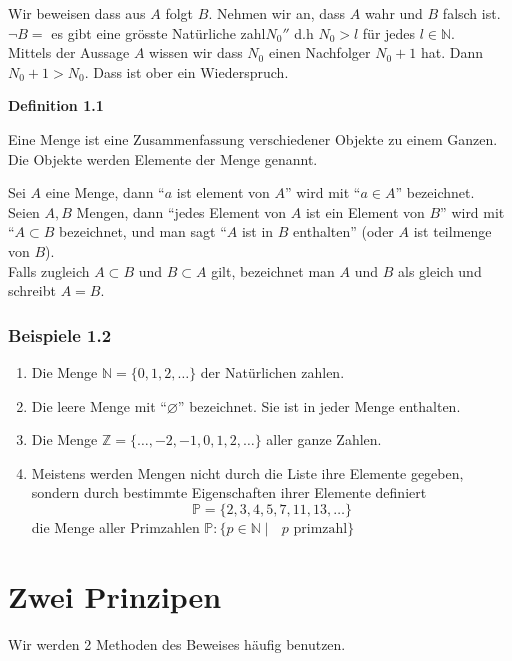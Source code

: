 \noindent Wir beweisen dass aus $A$ folgt $B$. Nehmen wir an, dass $A$ wahr und $B$ falsch ist. \\

\noindent $\lnot B=$ es gibt eine grösste Natürliche zahl$N_0''$ d.h $N_0>l$ für jedes $l \in \mathbb{N}$.\\

Mittels der Aussage $A$ wissen wir dass $N_0$ einen Nachfolger $N_0 +1$ hat. Dann $N_0+1>N_0$. Dass ist ober ein Wiederspruch.
\begin{framed}
\centerline{\textbf{Definition 1.1}}
\noindent Eine Menge ist eine Zusammenfassung verschiedener Objekte zu einem Ganzen.\\
Die Objekte werden Elemente der Menge genannt. 
\end{framed}
Sei $A$ eine Menge, dann ``$a$ ist element von $A$'' wird mit ``$a\in A$'' bezeichnet.\\
Seien $A,B$ Mengen, dann ``jedes Element von $A$ ist ein Element von $B$'' wird mit ``$A\subset B$ bezeichnet, und man sagt ``$A$ ist in $B$ enthalten'' (oder $A$ ist teilmenge von $B$). \\

Falls zugleich $A\subset B$ und $B\subset A$ gilt, bezeichnet man $A$ und $B$ als gleich und schreibt $A=B$. 

\subsubsection*{Beispiele 1.2}
\begin{enumerate}
	\item Die Menge $\mathbb{N}=\{0,1,2,\dots\}$ der Natürlichen zahlen.
	\item Die leere Menge mit ``$\varnothing$'' bezeichnet. Sie ist in jeder Menge enthalten.
	\item Die Menge $\mathbb{Z}=\{\dots,-2,-1,0,1,2,\dots\}$ aller ganze Zahlen.
	\item Meistens werden Mengen nicht durch die Liste ihre Elemente gegeben, sondern durch bestimmte Eigenschaften ihrer Elemente definiert $$\mathbb{P}=\{2,3,4,5,7,11,13,\dots\}$$ die Menge aller Primzahlen $\mathbb{P}:\{p\in\mathbb{N}\mid\text{ $p$ primzahl}\}$
\end{enumerate}
\section{Zwei Prinzipen}
Wir werden 2 Methoden des Beweises häufig benutzen.

